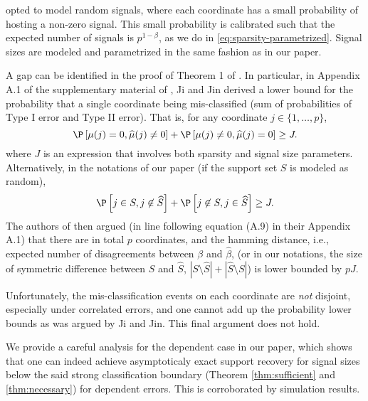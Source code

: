 \citet*{ji2012ups} opted to model random signals, where each coordinate has a small probability of hosting a non-zero signal.
This small probability is calibrated such that the expected number of signals is $p^{1-\beta}$, as we do in \eqref{eq:sparsity-parametrized}. Signal sizes are modeled and parametrized in the same fashion as in our paper.

A gap can be identified in the proof of Theorem 1 of \citet*{ji2012ups}.
In particular, in Appendix A.1 of the supplementary material of \citep{ji2012ups}, Ji and Jin derived a lower bound for the probability that a single coordinate being mis-classified (sum of probabilities of Type I error and Type II error).
That is, for any coordinate $j\in \{1,\ldots,p\}$,
$$
\P\left[\mu(j) = 0, \widehat\mu(j) \neq 0\right] + \P\left[\mu(j) \neq 0, \widehat\mu(j) = 0\right] \ge J.
$$
where $J$ is an expression that involves both sparsity and signal size parameters.
Alternatively, in the notations of our paper (if the support set $S$ is modeled as random),
$$
\P\left[j\in S, j\not\in\widehat{S}\right] + \P\left[j\not\in S, j\in\widehat{S}\right] \ge J.
$$
The authors of \citep{ji2012ups} then argued (in line following equation (A.9) in their Appendix A.1) that there are in total $p$ coordinates, and the hamming distance, i.e., expected number of disagreements between $\beta$ and $\widehat\beta$, (or in our notations, the size of symmetric difference between $S$ and $\widehat S$, $\left|S\setminus\widehat S\right| + \left|\widehat S\setminus S\right|$) is lower bounded by $pJ$.

Unfortunately, the mis-classification events on each coordinate are \emph{not} disjoint, especially under correlated errors, and one cannot add up the probability lower bounds as was argued by Ji and Jin.
This final argument does not hold.

We provide a careful analysis for the dependent case in our paper, which shows that one can indeed achieve asymptoticaly exact support recovery for signal sizes below the said strong classification boundary (Theorem \ref{thm:sufficient} and \ref{thm:necessary}) for dependent errors. This is corroborated by simulation results.
